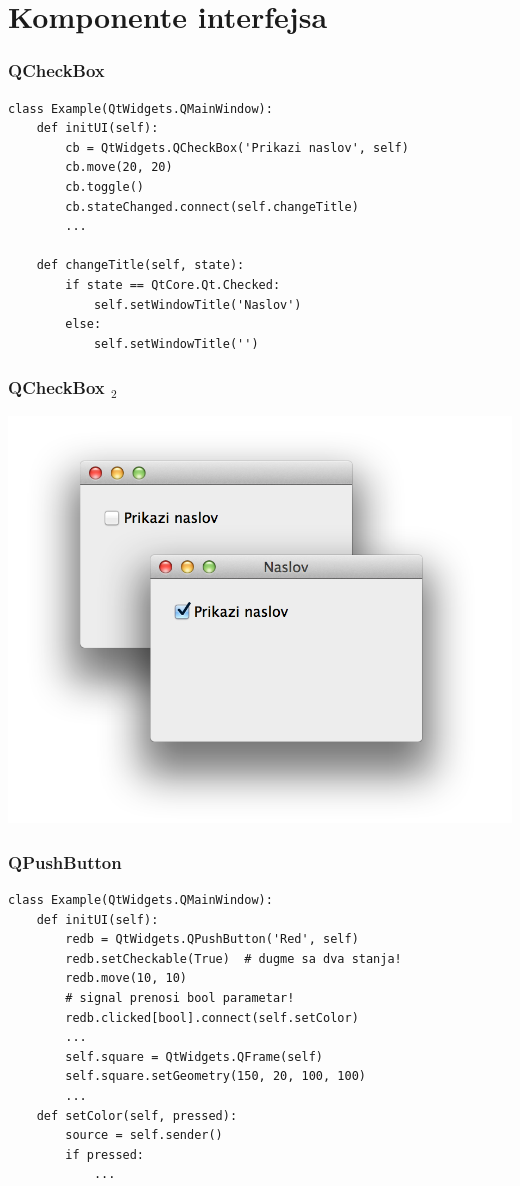 \documentclass[utf8,compress]{beamer}
\begin{document}
\section[Widgets]{Komponente interfejsa}

\begin{frame}[fragile]
  \frametitle{QCheckBox}
\begin{verbatim}
class Example(QtWidgets.QMainWindow):
    def initUI(self):
        cb = QtWidgets.QCheckBox('Prikazi naslov', self)
        cb.move(20, 20)
        cb.toggle()
        cb.stateChanged.connect(self.changeTitle)
        ...
        
    def changeTitle(self, state):      
        if state == QtCore.Qt.Checked:
            self.setWindowTitle('Naslov')
        else:
            self.setWindowTitle('')
\end{verbatim}
\end{frame}

\begin{frame}[fragile]
  \frametitle{QCheckBox $_2$}
\begin{center}
\includegraphics[scale=0.25]{pyqt12.png}
\end{center}
\end{frame}

\begin{frame}
  \frametitle{QPushButton}
\begin{verbatim}
class Example(QtWidgets.QMainWindow):
    def initUI(self):
        redb = QtWidgets.QPushButton('Red', self)
        redb.setCheckable(True)  # dugme sa dva stanja!
        redb.move(10, 10)
        # signal prenosi bool parametar!
        redb.clicked[bool].connect(self.setColor)
        ...
        self.square = QtWidgets.QFrame(self)
        self.square.setGeometry(150, 20, 100, 100)
        ...
    def setColor(self, pressed):
        source = self.sender()
        if pressed:
            ...
\end{verbatim}
\end{frame}
\end{document}
